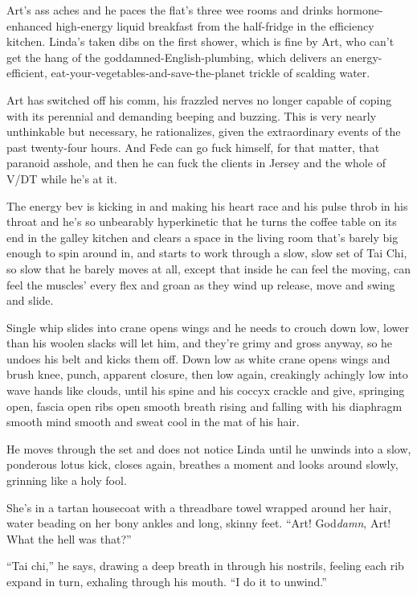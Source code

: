 Art’s ass aches and he paces the flat’s three wee rooms and drinks
hormone-enhanced high-energy liquid breakfast from the half-fridge
in the efficiency kitchen. Linda’s taken dibs on the first shower,
which is fine by Art, who can’t get the hang of the
goddamned-English-plumbing, which delivers an energy-efficient,
eat-your-vegetables-and-save-the-plan\-et trickle of scalding water.

Art has switched off his comm, his frazzled nerves no longer
capable of coping with its perennial and demanding beeping and
buzzing. This is very nearly unthinkable but necessary, he
rationalizes, given the extraordinary events of the past
twenty-four hours. And Fede can go fuck himself, for that matter,
that paranoid asshole, and then he can fuck the clients in Jersey
and the whole of V/DT while he’s at it.

The energy bev is kicking in and making his heart race and his
pulse throb in his throat and he’s so unbearably hyperkinetic that
he turns the coffee table on its end in the galley kitchen and
clears a space in the living room that’s barely big enough to spin
around in, and starts to work through a slow, slow set of Tai Chi,
so slow that he barely moves at all, except that inside he can feel
the moving, can feel the muscles’ every flex and groan as they wind
up release, move and swing and slide.

Single whip slides into crane opens wings and he needs to crouch
down low, lower than his woolen slacks will let him, and they’re
grimy and gross anyway, so he undoes his belt and kicks them off.
Down low as white crane opens wings and brush knee, punch, apparent
closure, then low again, creakingly achingly low into wave hands
like clouds, until his spine and his coccyx crackle and give,
springing open, fascia open ribs open smooth breath rising and
falling with his diaphragm smooth mind smooth and sweat cool in the
mat of his hair.

He moves through the set and does not notice Linda until he unwinds
into a slow, ponderous lotus kick, closes again, breathes a moment
and looks around slowly, grinning like a holy fool.

She’s in a tartan housecoat with a threadbare towel wrapped around
her hair, water beading on her bony ankles and long, skinny feet.
“Art! God\emph{damn}, Art! What the hell was that?”

“Tai chi,” he says, drawing a deep breath in through his nostrils,
feeling each rib expand in turn, exhaling through his mouth. “I do
it to unwind.”

